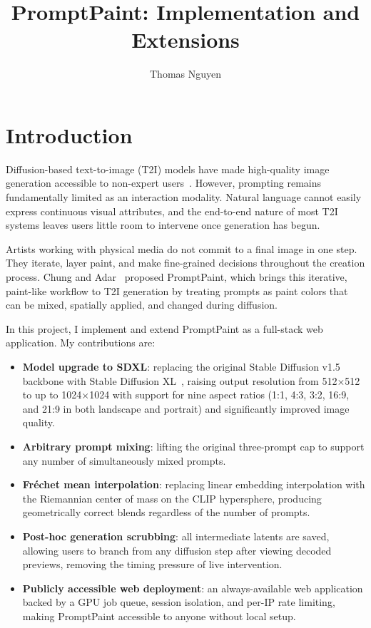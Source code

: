 \documentclass[sigconf]{acmart}
\title{PromptPaint: Implementation and Extensions}
\author{Thomas Nguyen}
\affiliation{%
  \institution{University of Toronto, Canada}
}
\begin{document}
\maketitle

\section{Introduction}

Diffusion-based text-to-image (T2I) models have made high-quality image generation
accessible to non-expert users~\cite{ramesh2022hierarchical,rombach2022high}.
However, prompting remains fundamentally limited as an interaction modality.
Natural language cannot easily express continuous visual attributes, and the
end-to-end nature of most T2I systems leaves users little room to intervene
once generation has begun.

Artists working with physical media do not commit to a final image in one step.
They iterate, layer paint, and make fine-grained decisions throughout the
creation process. Chung and Adar~\cite{chung2023promptpaint} proposed
PromptPaint, which brings this iterative, paint-like workflow to T2I generation
by treating prompts as paint colors that can be mixed, spatially applied, and
changed during diffusion.

In this project, I implement and extend PromptPaint as a full-stack web
application. My contributions are:

\begin{itemize}
  \item \textbf{Model upgrade to SDXL}: replacing the original Stable Diffusion
        v1.5 backbone with Stable Diffusion XL~\cite{podell2023sdxl}, raising
        output resolution from 512$\times$512 to up to 1024$\times$1024 with
        support for nine aspect ratios (1:1, 4:3, 3:2, 16:9, and 21:9 in both
        landscape and portrait) and significantly improved image quality.
  \item \textbf{Arbitrary prompt mixing}: lifting the original three-prompt cap
        to support any number of simultaneously mixed prompts.
  \item \textbf{Fréchet mean interpolation}: replacing linear embedding
        interpolation with the Riemannian center of mass on the CLIP hypersphere,
        producing geometrically correct blends regardless of the number of prompts.
  \item \textbf{Post-hoc generation scrubbing}: all intermediate latents are saved,
        allowing users to branch from any diffusion step after viewing decoded previews,
        removing the timing pressure of live intervention.
  \item \textbf{Publicly accessible web deployment}: an always-available web
        application backed by a GPU job queue, session isolation, and per-IP
        rate limiting, making PromptPaint accessible to anyone without local
        setup.
\end{itemize}
\end{document}
